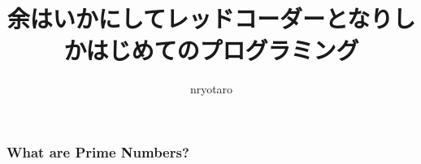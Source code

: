 \documentclass[lualatex,ja=standard]{beamer}
\title{余はいかにしてレッドコーダーとなりしかはじめてのプログラミング}
\author{nryotaro}
\institute{doge}
\begin{document}
\begin{frame}
\titlepage
\end{frame}
\begin{frame}
\frametitle{What are Prime Numbers?}
\end{frame}
\end{document}
